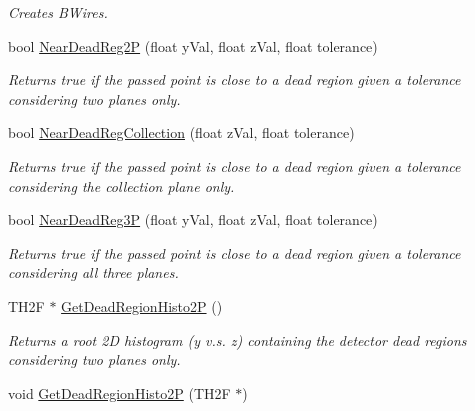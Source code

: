 \begin{DoxyCompactItemize}
\begin{DoxyCompactList}\small\item\em Creates B\-Wires. \end{DoxyCompactList}\item 
\hypertarget{classFindDeadRegions_a7a884dc4685e66734b98afea9a2c6c21}{bool \hyperlink{classFindDeadRegions_a7a884dc4685e66734b98afea9a2c6c21}{Near\-Dead\-Reg2\-P} (float y\-Val, float z\-Val, float tolerance)}\label{classFindDeadRegions_a7a884dc4685e66734b98afea9a2c6c21}

\begin{DoxyCompactList}\small\item\em Returns true if the passed point is close to a dead region given a tolerance considering two planes only. \end{DoxyCompactList}\item 
\hypertarget{classFindDeadRegions_a066953fc9c822dd5696ea9055c9fd7b2}{bool \hyperlink{classFindDeadRegions_a066953fc9c822dd5696ea9055c9fd7b2}{Near\-Dead\-Reg\-Collection} (float z\-Val, float tolerance)}\label{classFindDeadRegions_a066953fc9c822dd5696ea9055c9fd7b2}

\begin{DoxyCompactList}\small\item\em Returns true if the passed point is close to a dead region given a tolerance considering the collection plane only. \end{DoxyCompactList}\item 
\hypertarget{classFindDeadRegions_a2ef76eca81785361bf95c17e8e1a7574}{bool \hyperlink{classFindDeadRegions_a2ef76eca81785361bf95c17e8e1a7574}{Near\-Dead\-Reg3\-P} (float y\-Val, float z\-Val, float tolerance)}\label{classFindDeadRegions_a2ef76eca81785361bf95c17e8e1a7574}

\begin{DoxyCompactList}\small\item\em Returns true if the passed point is close to a dead region given a tolerance considering all three planes. \end{DoxyCompactList}\item 
\hypertarget{classFindDeadRegions_a712767abce6132b0dd6638a335da87fa}{T\-H2\-F $\ast$ \hyperlink{classFindDeadRegions_a712767abce6132b0dd6638a335da87fa}{Get\-Dead\-Region\-Histo2\-P} ()}\label{classFindDeadRegions_a712767abce6132b0dd6638a335da87fa}

\begin{DoxyCompactList}\small\item\em Returns a root 2\-D histogram (y v.\-s. z) containing the detector dead regions considering two planes only. \end{DoxyCompactList}\item 
\hypertarget{classFindDeadRegions_a93fcf74bb534831495f50a79fede19f9}{void \hyperlink{classFindDeadRegions_a93fcf74bb534831495f50a79fede19f9}{Get\-Dead\-Region\-Histo2\-P} (T\-H2\-F $\ast$)}\label{classFindDeadRegions_a93fcf74bb534831495f50a79fede19f9}


\end{DoxyCompactItemize}
